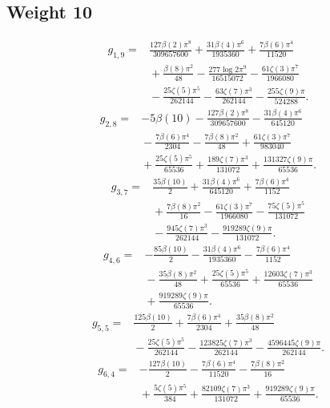 \subsection*{Weight 10}
\begin{align*}g_{1,9}={}&\frac{127 \beta(2) \pi^{8}}{309657600}+\frac{31 \beta(4) \pi^{6}}{1935360}+\frac{7 \beta(6) \pi^{4}}{11520}\\
&{}+\frac{\beta(8) \pi^{2}}{48}- \frac{277 \log 2 \pi^{9}}{16515072}- \frac{61 \zeta(3) \pi^{7}}{1966080}\\
&{}- \frac{25 \zeta(5) \pi^{5}}{262144}- \frac{63 \zeta(7) \pi^{3}}{262144}- \frac{255 \zeta(9) \pi}{524288}.\end{align*}
\begin{align*}g_{2,8}={}&- 5 \beta(10)- \frac{127 \beta(2) \pi^{8}}{309657600}- \frac{31 \beta(4) \pi^{6}}{645120}\\
&{}- \frac{7 \beta(6) \pi^{4}}{2304}- \frac{7 \beta(8) \pi^{2}}{48}+\frac{61 \zeta(3) \pi^{7}}{983040}\\
&{}+\frac{25 \zeta(5) \pi^{5}}{65536}+\frac{189 \zeta(7) \pi^{3}}{131072}+\frac{131327 \zeta(9) \pi}{65536}.\end{align*}
\begin{align*}g_{3,7}={}&\frac{35 \beta(10)}{2}+\frac{31 \beta(4) \pi^{6}}{645120}+\frac{7 \beta(6) \pi^{4}}{1152}\\
&{}+\frac{7 \beta(8) \pi^{2}}{16}- \frac{61 \zeta(3) \pi^{7}}{1966080}- \frac{75 \zeta(5) \pi^{5}}{131072}\\
&{}- \frac{945 \zeta(7) \pi^{3}}{262144}- \frac{919289 \zeta(9) \pi}{131072}.\end{align*}
\begin{align*}g_{4,6}={}&- \frac{85 \beta(10)}{2}- \frac{31 \beta(4) \pi^{6}}{1935360}- \frac{7 \beta(6) \pi^{4}}{1152}\\
&{}- \frac{35 \beta(8) \pi^{2}}{48}+\frac{25 \zeta(5) \pi^{5}}{65536}+\frac{12603 \zeta(7) \pi^{3}}{65536}\\
&{}+\frac{919289 \zeta(9) \pi}{65536}.\end{align*}
\begin{align*}g_{5,5}={}&\frac{125 \beta(10)}{2}+\frac{7 \beta(6) \pi^{4}}{2304}+\frac{35 \beta(8) \pi^{2}}{48}\\
&{}- \frac{25 \zeta(5) \pi^{5}}{262144}- \frac{123825 \zeta(7) \pi^{3}}{262144}- \frac{4596445 \zeta(9) \pi}{262144}.\end{align*}
\begin{align*}g_{6,4}={}&- \frac{127 \beta(10)}{2}- \frac{7 \beta(6) \pi^{4}}{11520}- \frac{7 \beta(8) \pi^{2}}{16}\\
&{}+\frac{5 \zeta(5) \pi^{5}}{384}+\frac{82109 \zeta(7) \pi^{3}}{131072}+\frac{919289 \zeta(9) \pi}{65536}.\end{align*}
